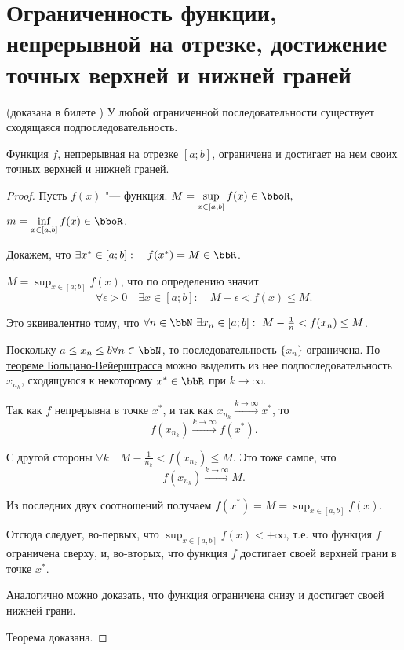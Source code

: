 \section{Ограниченность функции, непрерывной на отрезке, достижение точных верхней и нижней граней}

\begin{thm}(доказана в билете )
У любой ограниченной последовательности существует сходящаяся подпоследовательность.
\end{thm}


\begin{thm}  \label{th:ch2:Veyershtrass}
Функция $f$, непрерывная на отрезке $[a;b]$, ограничена и достигает на нем своих точных верхней и нижней граней.
\end{thm}
\begin{proof}
Пусть $f(x)$ "--- функция. $M = \sup_{x \in [a,b]}\limits f(x) \in \bboR,$  $m = \inf_{x \in [a,b]}\limits f(x) \in \bboR$.

Докажем, что $\exists x^* \in [a;b]:\quad f(x^*)= M \in \bbR$.
\smallskip

$M = \sup_{x \in [a;b]}\limits f(x)$, что по определению значит 
$$
\forall\epsilon > 0\quad \exists x\in [a;b]:\quad M-\epsilon < f(x) \le M. 
$$ 

Это эквивалентно тому, что $\forall n \in \bbN\ \exists x_n \in [a;b]:\ M-\frac{1}{n} < f(x_n) \le M $.

Поскольку $ a\le x_n \le b \forall n \in \bbN$, то последовательность $\{x_n\}$ ограничена. По \hyperref[th:ch1:TBV]{теореме Больцано-Вейерштрасса} можно выделить из нее подпоследовательность ${x_{n_k}}$, сходящуюся к некоторому $x^* \in \bbR$ при $k \to \infty$.

Так как $f$ непрерывна в точке $x^*$, и так как $x_{n_k}\xrightarrow{k \to \infty} x^*$, то  
$$
f(x_{n_k}) \xrightarrow{k \to \infty} f(x^*).
$$ 

С другой стороны $\forall k \quad M-\frac{1}{n_k} < f(x_{n_k}) \le M$. Это тоже самое, что
$$
f(x_{n_k}) \xrightarrow{k \to \infty} M.
$$

Из последних двух соотношений получаем $f(x^*) = M = \sup_{x \in [a,b]}\limits f(x) $. 

Отсюда следует, во-первых, что  $\sup_{x \in [a,b]}\limits f(x)<+\infty$, т.е. что функция $f$ ограничена сверху, и, во-вторых, что функция $f$ достигает своей верхней грани в точке $x^*$.

Аналогично можно доказать, что функция ограничена снизу и достигает своей нижней грани.

Теорема доказана.   
\end{proof}